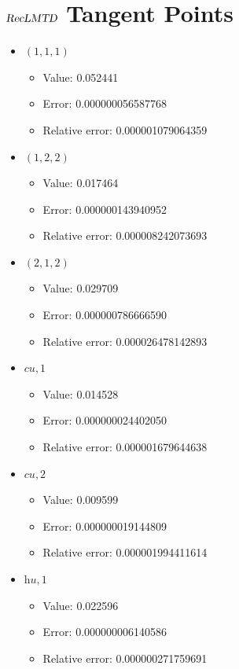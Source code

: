 \documentclass{article}%
\begin{document}
\section{$\textsl{RecLMTD}$ Tangent Points}%
\thispagestyle{plain}%
\begin{itemize}%
	\item $(1, 1, 1)$%
	\begin{itemize}%
		\item Value: 0.052441%
		\item Error: 0.000000056587768%
		\item Relative error: 0.000001079064359%
	\end{itemize}%
	\item $(1, 2, 2)$%
	\begin{itemize}%
		\item Value: 0.017464%
		\item Error: 0.000000143940952%
		\item Relative error: 0.000008242073693%
	\end{itemize}%
	\item $(2, 1, 2)$%
	\begin{itemize}%
		\item Value: 0.029709%
		\item Error: 0.000000786666590%
		\item Relative error: 0.000026478142893%
	\end{itemize}%
	\item $\textit{cu},1$%
	\begin{itemize}%
		\item Value: 0.014528%
		\item Error: 0.000000024402050%
		\item Relative error: 0.000001679644638%
	\end{itemize}%
	\item $\textit{cu},2$%
	\begin{itemize}%
		\item Value: 0.009599%
		\item Error: 0.000000019144809%
		\item Relative error: 0.000001994411614%
	\end{itemize}%
	\item $\textit{hu},1$%
	\begin{itemize}%
		\item Value: 0.022596%
		\item Error: 0.000000006140586%
		\item Relative error: 0.000000271759691%
	\end{itemize}%
\end{itemize}%
\end{document}

